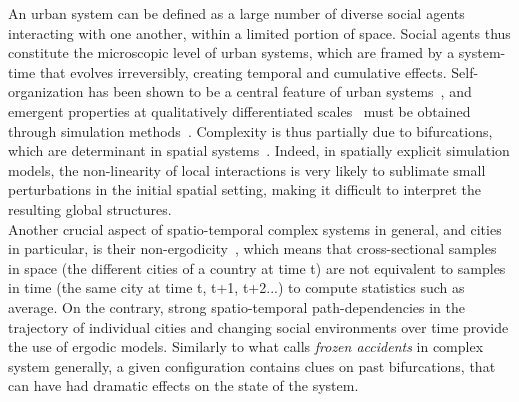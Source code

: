 \documentclass[Afour,sageh,times]{sagej}
\begin{document}
An urban system can be defined as a large number of diverse social agents interacting with one another, within a limited portion of space. Social agents thus constitute the microscopic level of urban systems, which are framed by a system-time that evolves irreversibly, creating temporal and cumulative effects. Self-organization has been shown to be a central feature of urban systems~\citep{AllenSanglier1981,saint1989villes, Portugali2000}, and emergent properties at qualitatively differentiated scales~\citep{pumain2006hierarchy, AzizAlaouiBertelle2009} must be obtained through simulation methods~\citep{Wu2002, Batty2007}. Complexity is thus partially due to bifurcations, which are determinant in spatial systems~\citep{Wilson1981, Wilson2002}. Indeed, in spatially explicit simulation models, the non-linearity of local interactions is very likely to sublimate small perturbations in the initial spatial setting, making it difficult to interpret the resulting global structures. \\
Another crucial aspect of spatio-temporal complex systems in general, and cities in particular, is their non-ergodicity~\citep{pumain2012urban}, which means that cross-sectional samples in space (the different cities of a country at time t) are not equivalent to samples in time (the same city at time t, t+1, t+2...) to compute statistics such as average. On the contrary, strong spatio-temporal path-dependencies in the trajectory of individual cities and changing social environments over time provide the use of ergodic models. Similarly to what \citet{gell1995quark} calls \emph{frozen accidents} in complex system generally, a given configuration contains clues on past bifurcations, that can have had dramatic effects on the state of the system. \\
\end{document}

